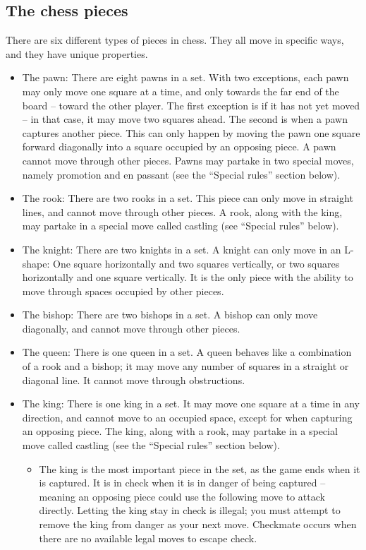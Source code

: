 \documentclass[12pt, a4paper]{article}
\begin{document}
\subsection{The chess pieces}
There are six different types of pieces in chess. They all move in specific ways, and they have unique properties.

\begin{itemize}
\item The pawn: There are eight pawns in a set. With two exceptions, each pawn may only move one square at a time, and only towards the far end of the board – toward the other player. The first exception is if it has not yet moved – in that case, it may move two squares ahead. The second is when a pawn captures another piece. This can only happen by moving the pawn one square forward diagonally into a square occupied by an opposing piece. A pawn cannot move through other pieces. Pawns may partake in two special moves, namely promotion and en passant (see the “Special rules” section below).
\item The rook: There are two rooks in a set. This piece can only move in straight lines, and cannot move through other pieces. A rook, along with the king, may partake in a special move called castling (see “Special rules” below).
\item The knight: There are two knights in a set. A knight can only move in an L-shape: One square horizontally and two squares vertically, or two squares horizontally and one square vertically. It is the only piece with the ability to move through spaces occupied by other pieces.
\item The bishop: There are two bishops in a set. A bishop can only move diagonally, and cannot move through other pieces.
\item The queen: There is one queen in a set. A queen behaves like a combination of a rook and a bishop; it may move any number of squares in a straight or diagonal line. It cannot move through obstructions.
\item The king: There is one king in a set. It may move one square at a time in any direction, and cannot move to an occupied space, except for when capturing an opposing piece. The king, along with a rook, may partake in a special move called castling (see the “Special rules” section below).
 
\begin{itemize}
\item The king is the most important piece in the set, as the game ends when it is captured. It is in check when it is in danger of being captured – meaning an opposing piece could use the following move to attack directly. Letting the king stay in check is illegal; you must attempt to remove the king from danger as your next move. Checkmate occurs when there are no available legal moves to escape check. 
\end{itemize}
\end{itemize}
\end{document}
